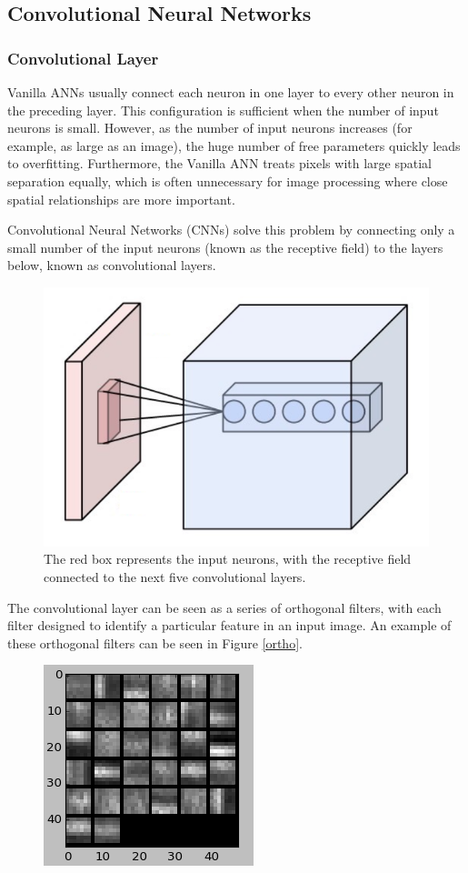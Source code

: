 \documentclass[twoside]{article}
\begin{document}
\begin{multicols}{2}
\subsection{Convolutional Neural Networks}
\subsubsection{Convolutional Layer}
Vanilla ANNs usually connect each neuron in one layer to every other neuron in the preceding layer. This configuration is sufficient when the number of input neurons is small. However, as the number of input neurons increases (for example, as large as an image), the huge number of free parameters quickly leads to overfitting. Furthermore, the Vanilla ANN treats pixels with large spatial separation equally, which is often unnecessary for image processing where close spatial relationships are more important. \par Convolutional Neural Networks (CNNs) solve this problem by connecting only a small number of the input neurons (known as the receptive field) to the layers below, known as convolutional layers.
\begin{figure}[H]
	\centering
	\includegraphics[width=0.5\linewidth]{images/Conv_layer}
	\caption{The red box represents the input neurons, with the receptive field connected to the next five convolutional layers.}
\end{figure}
The convolutional layer can be seen as a series of orthogonal filters, with each filter designed to identify a particular feature in an input image. An example of these orthogonal filters can be seen in Figure \ref{ortho}.
\begin{figure}[H]    
  \centering
    \includegraphics[width=0.5\linewidth]{images/ortho}

\end{figure}
\end{multicols}
\end{document}
